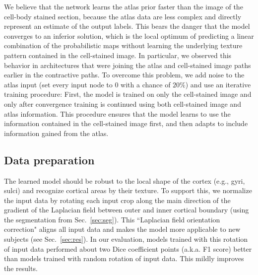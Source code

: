 \documentclass{article}
\newcommand\todo[1]{\textcolor{red}{#1}}
\begin{document}
We believe that the network learns the atlas prior faster than the image of the cell-body stained section, because the atlas data are less complex and directly represent an estimate of the output labels.
This bears the danger that the model converges to an inferior solution, which is the local optimum of predicting a linear combination of the probabilistic maps without learning the underlying texture pattern contained in the cell-stained image. 
In particular, we observed this behavior in architectures that were joining the atlas and cell-stained image paths earlier in the contractive paths. %
To overcome this problem, we add noise to the atlas input (set every input node to $0$ with a chance of $20\%$) and use an iterative training procedure: 
First, the model is trained on only the cell-stained image and only after convergence training is continued using both cell-stained image and atlas information. 
This procedure ensures that the model learns to use the information contained in the cell-stained image first, and then adapts to include information gained from the atlas. 

\vspace*{-.5\baselineskip}
\subsection{Data preparation}
\label{sec:arch:train}
\vspace*{-.5\baselineskip}

The learned model should be robust to the local shape of the cortex (e.g., gyri, sulci) and recognize cortical areas by their texture. 
To support this, we normalize the input data by rotating each input crop along the main direction of the gradient of the Laplacian field between outer and inner cortical boundary (using the segmentation from Sec.~\ref{sec:seg}). 
This ``Laplacian field orientation correction" aligns all input data and makes the model more applicable to new subjects (see Sec.~\ref{sec:res}). In our evaluation, models trained with this rotation of input data performed about two Dice coefficient points (a.k.a. F1 score) better than models trained with random rotation of input data. This mildly improves the results. 
\end{document}
